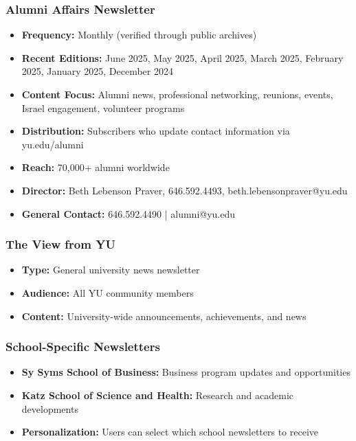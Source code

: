 \documentclass[12pt,letterpaper]{article}
\begin{document}
\subsubsection{Alumni Affairs Newsletter}
\begin{itemize}[leftmargin=*]
    \item \textbf{Frequency:} Monthly (verified through public archives)
    \item \textbf{Recent Editions:} June 2025, May 2025, April 2025, March 2025, February 2025, January 2025, December 2024
    \item \textbf{Content Focus:} Alumni news, professional networking, reunions, events, Israel engagement, volunteer programs
    \item \textbf{Distribution:} Subscribers who update contact information via yu.edu/alumni
    \item \textbf{Reach:} 70,000+ alumni worldwide
    \item \textbf{Director:} Beth Lebenson Praver, 646.592.4493, beth.lebensonpraver@yu.edu
    \item \textbf{General Contact:} 646.592.4490 | alumni@yu.edu
\end{itemize}

\subsubsection{The View from YU}
\begin{itemize}[leftmargin=*]
    \item \textbf{Type:} General university news newsletter
    \item \textbf{Audience:} All YU community members
    \item \textbf{Content:} University-wide announcements, achievements, and news
\end{itemize}

\subsubsection{School-Specific Newsletters}
\begin{itemize}[leftmargin=*]
    \item \textbf{Sy Syms School of Business:} Business program updates and opportunities
    \item \textbf{Katz School of Science and Health:} Research and academic developments
    \item \textbf{Personalization:} Users can select which school newsletters to receive
\end{itemize}
\end{document}
